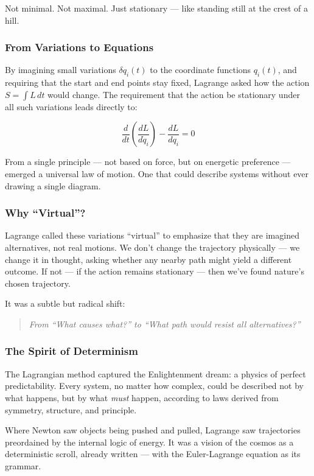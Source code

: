 Not minimal. Not maximal. Just stationary — like standing still at the crest of a hill.

\subsubsection{From Variations to Equations}

By imagining small variations \( \delta q_i(t) \) to the coordinate functions \( q_i(t) \), and requiring that the start and end points stay fixed, Lagrange asked how the action \( S = \int L\,dt \) would change. The requirement that the action be stationary under all such variations leads directly to:

\[
\frac{d}{dt} \left( \frac{dL}{d\dot{q}_i} \right) - \frac{dL}{dq_i} = 0
\]

From a single principle — not based on force, but on energetic preference — emerged a universal law of motion. One that could describe systems without ever drawing a single diagram.

\subsubsection*{Why “Virtual”?}

Lagrange called these variations “virtual” to emphasize that they are imagined alternatives, not real motions. We don’t change the trajectory physically — we change it in thought, asking whether any nearby path might yield a different outcome. If not — if the action remains stationary — then we’ve found nature’s chosen trajectory.

It was a subtle but radical shift:
\begin{quote}
    \textit{From “What causes what?” to “What path would resist all alternatives?”}
\end{quote}

\subsubsection{The Spirit of Determinism}

The Lagrangian method captured the Enlightenment dream: a physics of perfect predictability. Every system, no matter how complex, could be described not by what happens, but by what \textit{must} happen, according to laws derived from symmetry, structure, and principle.

Where Newton saw objects being pushed and pulled, Lagrange saw trajectories preordained by the internal logic of energy. It was a vision of the cosmos as a deterministic scroll, already written — with the Euler-Lagrange equation as its grammar.

